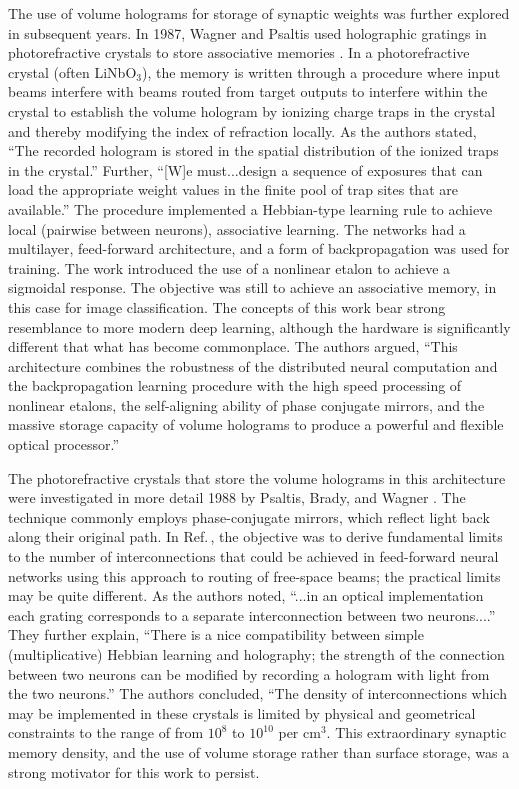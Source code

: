 The use of volume holograms for storage of synaptic weights was further explored in subsequent years. In 1987, Wagner and Psaltis used holographic gratings in photorefractive crystals to store associative memories \cite{waps1987}. In a photorefractive crystal (often LiNbO$_3$), the memory is written through a procedure where input beams interfere with beams routed from target outputs to interfere within the crystal to establish the volume hologram by ionizing charge traps in the crystal and thereby modifying the index of refraction locally. As the authors stated, ``The recorded hologram is stored in the spatial distribution of the ionized traps in the crystal.'' Further, ``[W]e must...design a sequence of exposures that can load the appropriate weight values in the finite pool of trap sites that are available.'' The procedure implemented a Hebbian-type learning rule to achieve local (pairwise between neurons), associative learning. The networks had a multilayer, feed-forward architecture, and a form of backpropagation was used for training. The work introduced the use of a nonlinear etalon to achieve a sigmoidal response. The objective was still to achieve an associative memory, in this case for image classification. The concepts of this work bear strong resemblance to more modern deep learning, although the hardware is significantly different that what has become commonplace. The authors argued, ``This architecture combines the robustness of the distributed neural computation and the backpropagation learning procedure with the high speed processing of nonlinear etalons, the self-aligning ability of phase conjugate mirrors, and the massive storage capacity of volume holograms to produce a powerful and flexible optical processor.''

The photorefractive crystals that store the volume holograms in this architecture were investigated in more detail 1988 by Psaltis, Brady, and Wagner \cite{psbr1988}. The technique commonly employs phase-conjugate mirrors, which reflect light back along their original path. In Ref.\,\cite{psbr1988}, the objective was to derive fundamental limits to the number of interconnections that could be achieved in feed-forward neural networks using this approach to routing of free-space beams; the practical limits may be quite different. As the authors noted, ``...in an optical implementation each grating corresponds to a separate interconnection between two neurons....'' They further explain, ``There is a nice compatibility between simple (multiplicative) Hebbian learning and holography; the strength of the connection between two neurons can be modified by recording a hologram with light from the two neurons.'' The authors concluded, ``The density of interconnections which may be implemented in these crystals is limited by physical and geometrical constraints to the range of from $10^8$ to $10^{10}$ per cm$^3$. This extraordinary synaptic memory density, and the use of volume storage rather than surface storage, was a strong motivator for this work to persist. 
 
